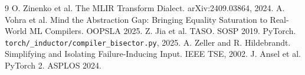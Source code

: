 \documentclass[11pt]{article}
\newcommand{\code}[1]{\texttt{#1}}
\begin{document}
\begin{thebibliography}{9}\small
{} O. Zinenko et al. The MLIR Transform Dialect. arXiv:2409.03864, 2024.
 A. Vohra et al. Mind the Abstraction Gap: Bringing Equality Saturation to Real-World ML Compilers. OOPSLA 2025.
 Z. Jia et al. TASO. SOSP 2019.
 PyTorch. \code{torch/\_inductor/compiler\_bisector.py}, 2025.
 A. Zeller and R. Hildebrandt. Simplifying and Isolating Failure-Inducing Input. IEEE TSE, 2002.
 J. Ansel et al. PyTorch 2. ASPLOS 2024.
\end{thebibliography}
\end{document}

